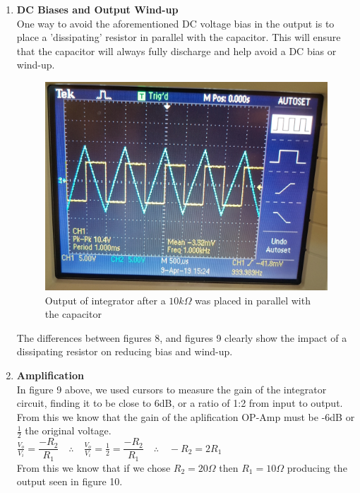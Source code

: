 \documentclass[a4paper,11pt]{article}
\begin{document}
\begin{flushleft}
\begin{enumerate}
		\newpage
		\item
			\textbf{DC Biases and Output Wind-up}\\
			One way to avoid the aforementioned DC voltage bias in the output is to place a 							'dissipating' resistor in parallel with the capacitor. This will ensure that the capacitor 					will always fully discharge and help avoid a DC bias or wind-up.\\
			\begin{figure}[ht]
				\centering
				\includegraphics[width=0.6\linewidth]{Drifting}
				\caption{Output of integrator after a $10k\Omega$ was placed in parallel with the 							capacitor}
			\end{figure}
			The differences between figures 8, and figures 9 clearly show the impact of a dissipating 					resistor on reducing bias and wind-up.
		\item
			\textbf{Amplification}\\
			In figure 9 above, we used cursors to measure the gain of the integrator circuit, finding it 			to be close to 6dB, or a ratio of 1:2 from input to output. From this we know that the gain 				of the aplification OP-Amp must be -6dB or $\frac{1}{2}$ the original voltage.\\
			$\frac{V_{o}}{V_{i}} = \dfrac{-R_{2}}{R_{1}} \quad \therefore\quad \frac{V_{o}}{V_{i}} = 					\frac{1}{2} = \dfrac{-R_{2}}{R_{1}} \quad \therefore \quad -R_{2} = 2R_{1} $\\
			From this we know that if we chose $R_{2} = 20\Omega$ then $R_{1} = 10\Omega$
			producing the output seen in figure 10.
			

\end{enumerate}
\end{flushleft}
\end{document}

